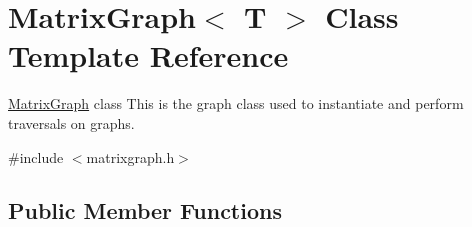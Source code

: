 \hypertarget{class_matrix_graph}{}\section{Matrix\+Graph$<$ T $>$ Class Template Reference}
\label{class_matrix_graph}


\mbox{\hyperlink{class_matrix_graph}{Matrix\+Graph}} class This is the graph class used to instantiate and perform traversals on graphs.  




{\ttfamily \#include $<$matrixgraph.\+h$>$}

\subsection*{Public Member Functions}
